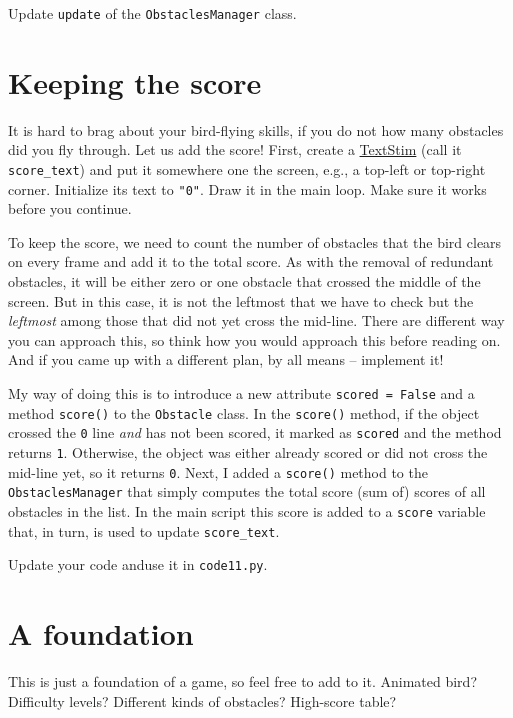 \documentclass[
]{book}
\begin{document}
Update \texttt{update} of the \texttt{ObstaclesManager} class.

\hypertarget{keeping-the-score}{%
\section{Keeping the score}\label{keeping-the-score}}

It is hard to brag about your bird-flying skills, if you do not how many obstacles did you fly through. Let us add the score! First, create a \href{https://psychopy.org/api/visual/textstim.html\#psychopy.visual.TextStim}{TextStim} (call it \texttt{score\_text}) and put it somewhere one the screen, e.g., a top-left or top-right corner. Initialize its text to \texttt{"0"}. Draw it in the main loop. Make sure it works before you continue.

To keep the score, we need to count the number of obstacles that the bird clears on every frame and add it to the total score. As with the removal of redundant obstacles, it will be either zero or one obstacle that crossed the middle of the screen. But in this case, it is not the leftmost that we have to check but the \emph{leftmost} among those that did not yet cross the mid-line. There are different way you can approach this, so think how you would approach this before reading on. And if you came up with a different plan, by all means -- implement it!

My way of doing this is to introduce a new attribute \texttt{scored\ =\ False} and a method \texttt{score()} to the \texttt{Obstacle} class. In the \texttt{score()} method, if the object crossed the \texttt{0} line \emph{and} has not been scored, it marked as \texttt{scored} and the method returns \texttt{1}. Otherwise, the object was either already scored or did not cross the mid-line yet, so it returns \texttt{0}. Next, I added a \texttt{score()} method to the \texttt{ObstaclesManager} that simply computes the total score (sum of) scores of all obstacles in the list. In the main script this score is added to a \texttt{score} variable that, in turn, is used to update \texttt{score\_text}.

Update your code anduse it in \texttt{code11.py}.

\hypertarget{a-foundation}{%
\section{A foundation}\label{a-foundation}}

This is just a foundation of a game, so feel free to add to it. Animated bird? Difficulty levels? Different kinds of obstacles? High-score table?
\end{document}
